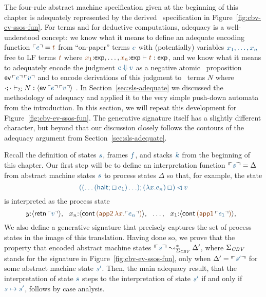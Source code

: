 The four-rule abstract machine specification given at the
beginning of this chapter is adequately represented by the derived
\sls~specification in Figure~\ref{fig:cbv-ev-ssos-fun}. For terms and
for deductive computations, adequacy is a well-understood concept: we
know what it means to define an adequate encoding function $\interp{e}
= \lf{t}$ from ``on-paper'' terms $\obj{e}$ with (potentially) variables
$\obj{x_1,\ldots,x_n}$ free to LF terms $\lf{t}$ where $\lf{x_1}{:}{\sf
  exp},\ldots,\lf{x_n}{:}{\sf exp} \vdash \lf{t} : {\sf exp}$, and we know what
it means to adequately encode the judgment $\obj{e \Downarrow v}$ as a
negative atomic \sls~proposition ${\sf ev}\,\interp{e}\,\interp{v}$
and to encode derivations of this judgment to \sls~terms $N$ where
$\slst{\Sigma}{\cdot}{\cdot}{N}{\susp{{\sf
      ev}\,\interp{e}\,\interp{v}}}$
\cite{harper93framework,harper07mechanizing}. 
%
In Section~\ref{sec:sls-adequate} we discussed the methodology of
adequacy and applied it to the very simple push-down automata from the
introduction. In this section, we will repeat this development for
Figure~\ref{fig:cbv-ev-ssos-fun}. The generative signature itself has
a slightly different character, but beyond that our discussion closely
follows the contours of the adequacy argument from
Section~\ref{sec:sls-adequate}.

Recall the definition of states $\obj{s}$, frames $\obj{f}$, and stacks
$\obj{k}$ from the beginning of this chapter. 
Our 
first step will be to define an interpretation function 
$\ctxinterp{s} = \Delta$ from 
abstract machine states $\obj{s}$
to process states $\Delta$ so that, for example, the
state
\[
\obj{((\ldots({\sf halt}; \Box\,e_1)\ldots); (\lambda x.e_n)\,\Box) \lhd v}
\]
is interpreted as the process state
\[
y{:}\susp{{\sf retn}\,\interp{v}}, ~~
x_n{:}\susp{{\sf cont}\,\lf{({\sf app2}\,\lambda x.\interp{e_n})}}, ~~
\ldots, ~~
x_1{:}\susp{{\sf cont}\,\lf{({\sf app1}\,\interp{e_1})}}, ~~
\]
We also define a generative signature that precisely captures the set
of process states in the image of this translation. Having done so, we
prove that the property that encoded abstract machine states
$\ctxinterp{s} \leadsto^*_{\Sigma_{\it CBV}} \Delta'$, where $\Sigma_{\it CBV}$ 
stands for the signature in Figure~\ref{fig:cbv-ev-ssos-fun}, 
only when 
$\Delta' = \ctxinterp{s'}$ for some abstract machine state
$\obj{s'}$. Then, the main adequacy result, that the interpretation of
state $\obj{s}$ steps to the interpretation of state $\obj{s'}$ if and only if 
$\obj{s \mapsto s'}$, follows by case analysis.


